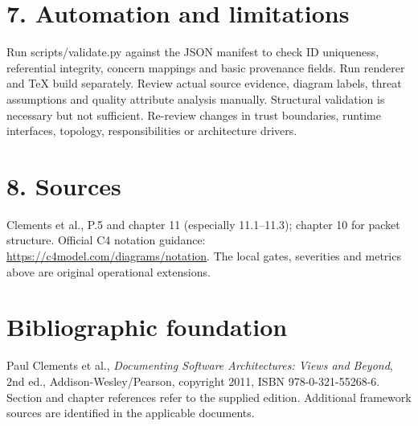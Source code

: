 \documentclass[11pt,letterpaper]{article}
\begin{document}
\section*{7. Automation and limitations}
Run scripts/validate.py against the JSON manifest to check ID uniqueness, referential integrity, concern mappings and basic provenance fields. Run renderer and TeX build separately. Review actual source evidence, diagram labels, threat assumptions and quality attribute analysis manually. Structural validation is necessary but not sufficient. Re-review changes in trust boundaries, runtime interfaces, topology, responsibilities or architecture drivers.\par\smallskip
\section*{8. Sources}
Clements et al., P.5 and chapter 11 (especially 11.1--11.3); chapter 10 for packet structure. Official C4 notation guidance: \url{https://c4model.com/diagrams/notation}. The local gates, severities and metrics above are original operational extensions.\par\smallskip
\section*{Bibliographic foundation}
Paul Clements et al., \emph{Documenting Software Architectures: Views and Beyond}, 2nd ed., Addison-Wesley/Pearson, copyright 2011, ISBN 978-0-321-55268-6. Section and chapter references refer to the supplied edition. Additional framework sources are identified in the applicable documents.\par
\end{document}
